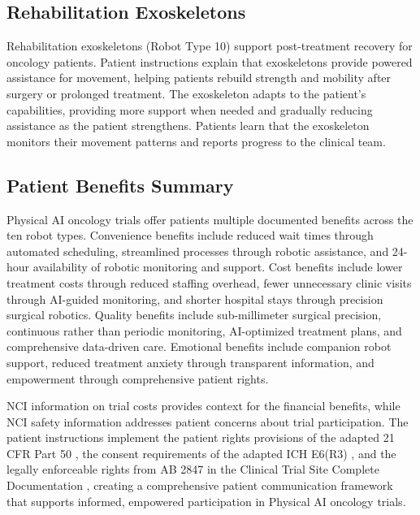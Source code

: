 \subsection{Rehabilitation Exoskeletons}
\label{subsec:instructions-rehab}

Rehabilitation exoskeletons (Robot Type 10) support post-treatment recovery for
oncology patients. Patient instructions explain that exoskeletons provide
powered assistance for movement, helping patients rebuild strength and mobility
after surgery or prolonged treatment. The exoskeleton adapts to the patient's
capabilities, providing more support when needed and gradually reducing
assistance as the patient strengthens. Patients learn that the exoskeleton
monitors their movement patterns and reports progress to the clinical team.

\subsection{Patient Benefits Summary}
\label{subsec:instructions-benefits}

Physical AI oncology trials offer patients multiple documented benefits across
the ten robot types. Convenience benefits include reduced wait times through
automated scheduling, streamlined processes through robotic assistance, and
24-hour availability of robotic monitoring and support. Cost benefits include
lower treatment costs through reduced staffing overhead, fewer unnecessary
clinic visits through AI-guided monitoring, and shorter hospital stays through
precision surgical robotics. Quality benefits include sub-millimeter surgical
precision, continuous rather than periodic monitoring, AI-optimized treatment
plans, and comprehensive data-driven care. Emotional benefits include companion
robot support, reduced treatment anxiety through transparent information, and
empowerment through comprehensive patient rights.

NCI information on trial costs \cite{nci-trials-paying} provides context for
the financial benefits, while NCI safety information \cite{nci-trials-safety}
addresses patient concerns about trial participation. The patient instructions
implement the patient rights provisions of the adapted 21 CFR Part 50
\cite{cfr50-adapt}, the consent requirements of the adapted ICH E6(R3)
\cite{ich-adapt}, and the legally enforceable rights from AB 2847 in the
Clinical Trial Site Complete Documentation \cite{site-docs}, creating a
comprehensive patient communication framework that supports informed,
empowered participation in Physical AI oncology trials.

